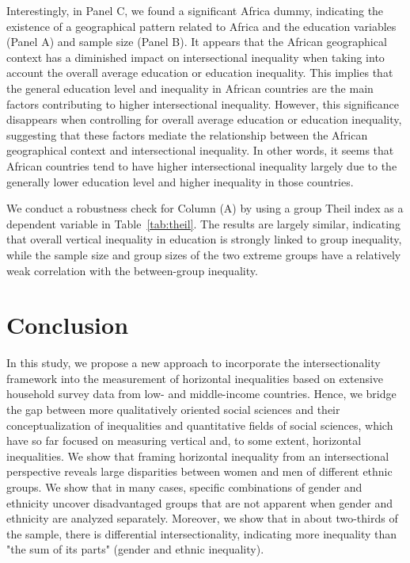 Interestingly, in Panel C, we found a significant Africa dummy, indicating the existence of a geographical pattern related to Africa and the education variables (Panel A) and sample size (Panel B). It appears that the African geographical context has a diminished impact on intersectional inequality when taking into account the overall average education or education inequality. This implies that the general education level and inequality in African countries are the main factors contributing to higher intersectional inequality. However, this significance disappears when controlling for overall average education or education inequality, suggesting that these factors mediate the relationship between the African geographical context and intersectional inequality. In other words, it seems that African countries tend to have higher intersectional inequality largely due to the generally lower education level and higher inequality in those countries.

We conduct a robustness check for Column (A) by using a group Theil index as a dependent variable in Table~\ref{tab:theil}. The results are largely similar, indicating that overall vertical inequality in education is strongly linked to group inequality, while the sample size and group sizes of the two extreme groups have a relatively weak correlation with the between-group inequality.
\hypertarget{conclusion}{%
\section{Conclusion}\label{conclusion}}

In this study, we propose a new approach to incorporate the intersectionality framework into the measurement of horizontal inequalities based on extensive household survey data from low- and middle-income countries. Hence, we bridge the gap between more qualitatively oriented social sciences and their conceptualization of inequalities and quantitative fields of social sciences, which have so far focused on measuring vertical and, to some extent, horizontal inequalities. We show that framing horizontal inequality from an intersectional perspective reveals large disparities between women and men of different ethnic groups. We show that in many cases, specific combinations of gender and ethnicity uncover disadvantaged groups that are not apparent when gender and ethnicity are analyzed separately. Moreover, we show that in about two-thirds of the sample, there is differential intersectionality, indicating more inequality than "the sum of its parts" (gender and ethnic inequality). 

